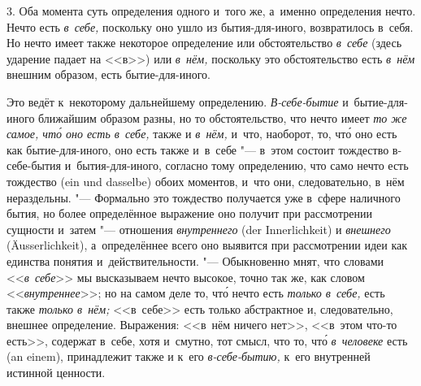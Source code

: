 3. Оба момента суть определения одного и~того же, а~именно определения
нечто. Нечто есть {\em в~себе,} поскольку оно ушло из
бытия-для-иного, возвратилось в~себя. Но нечто имеет также некоторое
определение или обстоятельство {\em в~себе} (здесь
ударение падает на <<в>>) или {\em в~нём,} поскольку это
обстоятельство есть {\em в~нём} внешним образом, есть
бытие-для-иного.

Это ведёт к~некоторому дальнейшему определению.
{\em В-себе-бытие} и~бытие-для-иного ближайшим
образом разны, но то обстоятельство, что нечто имеет
{\em то же самое, чт\'{о} оно есть в~себе,} также и {\em в~нём,} и~что,
наоборот, то,
чт\'{о} оно есть как бытие-для-иного, оно есть также и~в~себе "--- в~этом
состоит тождество в-себе-бытия и~бытия-для-иного, согласно тому
определению, что само нечто есть тождество (ein und dasselbe) обоих
моментов, и~что они, следовательно, в~нём нераздельны. "--- Формально это
тождество получается уже в~сфере наличного бытия, но более определённое
выражение оно получит при рассмотрении сущности и~затем "--- отношения
{\em внутреннего} (der Inner\-lich\-keit) и
{\em внешнего} (Äusser\-lich\-keit), а~определённее всего
оно выявится при рассмотрении идеи как единства понятия и~действительности.
"--- Обыкновенно мнят, что словами <<{\em в~себе}>> мы
высказываем нечто высокое, точно так же, как словом
<<{\em внутреннее}>>; но на самом деле то, чт\'{о} нечто есть
{\em только в~себе,} есть также {\em только в~нём;} <<в~себе>> есть только
абстрактное и, следовательно, внешнее определение. Выражения: <<в~нём
ничего нет>>, <<в~этом что-то есть>>, содержат в~себе, хотя и~смутно, тот
смысл, что то, чт\'{о} {\em в~человеке} есть (an einem), принадлежит также
и к~его {\em в-себе-бытию,} к~его внутренней истинной ценности.

